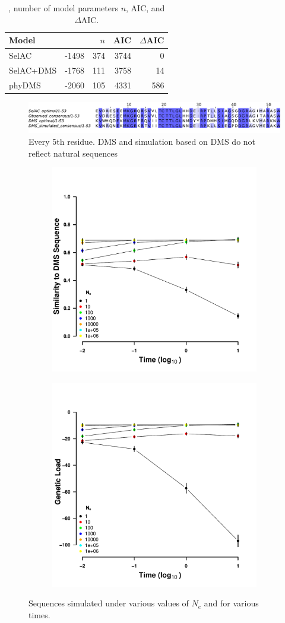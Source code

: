 \documentclass[12pt]{article}
\begin{document}
\begin{table}
  \centering
  \begin{tabular}{lrrrr}
    Model	& \LLik &$n$ & AIC & $\Delta$AIC\\ \hline 
    SelAC	& -1498 & 374& 3744&  0\\
    SelAC+DMS 	& -1768 & 111& 3758& 14\\
    phyDMS 	& -2060 & 105& 4331& 586\\

  \end{tabular}
  \caption{\LLik, number of model parameters $n$, AIC, and $\Delta$AIC.}
  \label{tab:AIC}
\end{table}


\begin{figure}[H]
     \centering
	\includegraphics[width=\textwidth]{img/seq_simil_short.pdf}
	\caption{Every 5th residue. DMS and simulation based on DMS do not reflect natural sequences}
	\label{fig:sim_seqs_cons}
\end{figure}

\begin{figure}[h]
    \centering
    \begin{subfigure}
        \centering
        \includegraphics[width=.45\textwidth]{img/simulated_dist_time.pdf}
    \end{subfigure}
    \begin{subfigure}
        \centering
        \includegraphics[width=.45\textwidth]{img/simulated_gl_time.pdf}
    \end{subfigure}
    \caption{Sequences simulated under various values of $N_e$ and for various times.}
    \label{fig:dms_sim}
\end{figure}
\end{document}
